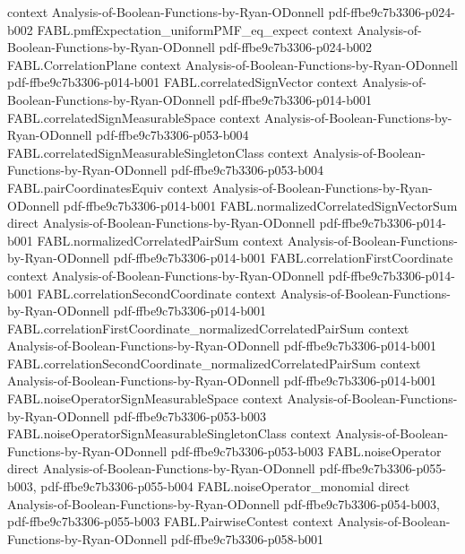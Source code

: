 \begin{theorem}
  {context}
  {Analysis-of-Boolean-Functions-by-Ryan-ODonnell}
  {pdf-ffbe9c7b3306-p024-b002}
\proofstep
  {FABL.pmfExpectation_uniformPMF_eq_expect}
  {context}
  {Analysis-of-Boolean-Functions-by-Ryan-ODonnell}
  {pdf-ffbe9c7b3306-p024-b002}
\proofstep
  {FABL.CorrelationPlane}
  {context}
  {Analysis-of-Boolean-Functions-by-Ryan-ODonnell}
  {pdf-ffbe9c7b3306-p014-b001}
\proofstep
  {FABL.correlatedSignVector}
  {context}
  {Analysis-of-Boolean-Functions-by-Ryan-ODonnell}
  {pdf-ffbe9c7b3306-p014-b001}
\proofstep
  {FABL.correlatedSignMeasurableSpace}
  {context}
  {Analysis-of-Boolean-Functions-by-Ryan-ODonnell}
  {pdf-ffbe9c7b3306-p053-b004}
\proofstep
  {FABL.correlatedSignMeasurableSingletonClass}
  {context}
  {Analysis-of-Boolean-Functions-by-Ryan-ODonnell}
  {pdf-ffbe9c7b3306-p053-b004}
\proofstep
  {FABL.pairCoordinatesEquiv}
  {context}
  {Analysis-of-Boolean-Functions-by-Ryan-ODonnell}
  {pdf-ffbe9c7b3306-p014-b001}
\proofstep
  {FABL.normalizedCorrelatedSignVectorSum}
  {direct}
  {Analysis-of-Boolean-Functions-by-Ryan-ODonnell}
  {pdf-ffbe9c7b3306-p014-b001}
\proofstep
  {FABL.normalizedCorrelatedPairSum}
  {context}
  {Analysis-of-Boolean-Functions-by-Ryan-ODonnell}
  {pdf-ffbe9c7b3306-p014-b001}
\proofstep
  {FABL.correlationFirstCoordinate}
  {context}
  {Analysis-of-Boolean-Functions-by-Ryan-ODonnell}
  {pdf-ffbe9c7b3306-p014-b001}
\proofstep
  {FABL.correlationSecondCoordinate}
  {context}
  {Analysis-of-Boolean-Functions-by-Ryan-ODonnell}
  {pdf-ffbe9c7b3306-p014-b001}
\proofstep
  {FABL.correlationFirstCoordinate_normalizedCorrelatedPairSum}
  {context}
  {Analysis-of-Boolean-Functions-by-Ryan-ODonnell}
  {pdf-ffbe9c7b3306-p014-b001}
\proofstep
  {FABL.correlationSecondCoordinate_normalizedCorrelatedPairSum}
  {context}
  {Analysis-of-Boolean-Functions-by-Ryan-ODonnell}
  {pdf-ffbe9c7b3306-p014-b001}
\proofstep
  {FABL.noiseOperatorSignMeasurableSpace}
  {context}
  {Analysis-of-Boolean-Functions-by-Ryan-ODonnell}
  {pdf-ffbe9c7b3306-p053-b003}
\proofstep
  {FABL.noiseOperatorSignMeasurableSingletonClass}
  {context}
  {Analysis-of-Boolean-Functions-by-Ryan-ODonnell}
  {pdf-ffbe9c7b3306-p053-b003}
\proofstep
  {FABL.noiseOperator}
  {direct}
  {Analysis-of-Boolean-Functions-by-Ryan-ODonnell}
  {pdf-ffbe9c7b3306-p055-b003,
    pdf-ffbe9c7b3306-p055-b004}
\proofstep
  {FABL.noiseOperator_monomial}
  {direct}
  {Analysis-of-Boolean-Functions-by-Ryan-ODonnell}
  {pdf-ffbe9c7b3306-p054-b003,
    pdf-ffbe9c7b3306-p055-b003}
\proofstep
  {FABL.PairwiseContest}
  {context}
  {Analysis-of-Boolean-Functions-by-Ryan-ODonnell}
  {pdf-ffbe9c7b3306-p058-b001}

\end{theorem}
